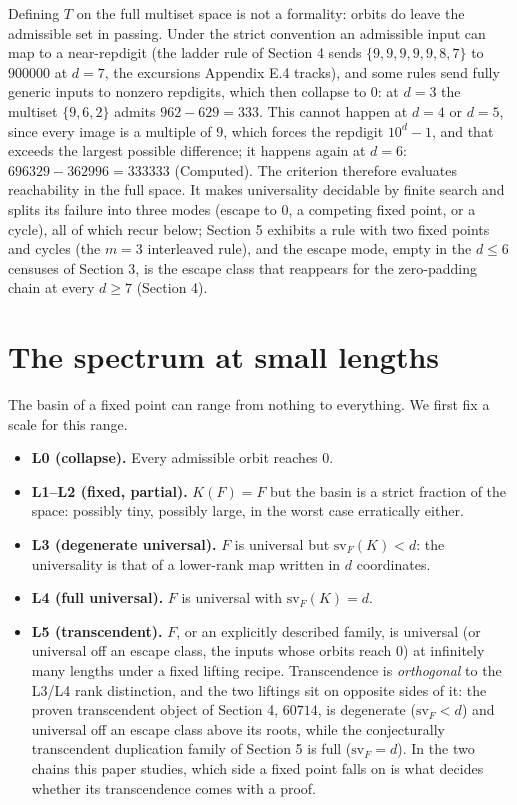 \documentclass[11pt,letterpaper]{article}
\providecommand{\tightlist}{%
  \setlength{\itemsep}{0pt}\setlength{\parskip}{0pt}}
\theoremstyle{paperstyle}
\theoremstyle{paperstyledef}
\theoremstyle{paperstylerem}
\begin{document}
Defining \(T\) on the full multiset space is not a formality: orbits do leave the admissible set in passing. Under the strict convention an admissible input can map to a near-repdigit (the ladder rule of Section 4 sends \(\{9,9,9,9,9,8,7\}\) to \(900000\) at \(d = 7\), the excursions Appendix E.4 tracks), and some rules send fully generic inputs to nonzero repdigits, which then collapse to \(0\): at \(d = 3\) the multiset \(\{9,6,2\}\) admits \(962 - 629 = 333\). This cannot happen at \(d = 4\) or \(d = 5\), since every image is a multiple of \(9\), which forces the repdigit \(10^d - 1\), and that exceeds the largest possible difference; it happens again at \(d = 6\): \(696329 - 362996 = 333333\) (Computed). The criterion therefore evaluates reachability in the full space. It makes universality decidable by finite search and splits its failure into three modes (escape to \(0\), a competing fixed point, or a cycle), all of which recur below; Section 5 exhibits a rule with two fixed points and cycles (the \(m = 3\) interleaved rule), and the escape mode, empty in the \(d \leq 6\) censuses of Section 3, is the escape class that reappears for the zero-padding chain at every \(d \geq 7\) (Section 4).

\section{The spectrum at small lengths}\label{the-spectrum-at-small-lengths}

The basin of a fixed point can range from nothing to everything. We first fix a scale for this range.

\begin{itemize}
\tightlist
\item
  \textbf{L0 (collapse).} Every admissible orbit reaches \(0\).
\item
  \textbf{L1--L2 (fixed, partial).} \(K(F) = F\) but the basin is a strict fraction of the space: possibly tiny, possibly large, in the worst case erratically either.
\item
  \textbf{L3 (degenerate universal).} \(F\) is universal but \(\mathrm{sv}_F(K) < d\): the universality is that of a lower-rank map written in \(d\) coordinates.
\item
  \textbf{L4 (full universal).} \(F\) is universal with \(\mathrm{sv}_F(K) = d\).
\item
  \textbf{L5 (transcendent).} \(F\), or an explicitly described family, is universal (or universal off an escape class, the inputs whose orbits reach \(0\)) at infinitely many lengths under a fixed lifting recipe. Transcendence is \emph{orthogonal} to the L3/L4 rank distinction, and the two liftings sit on opposite sides of it: the proven transcendent object of Section 4, \(60714\), is degenerate (\(\mathrm{sv}_F < d\)) and universal off an escape class above its roots, while the conjecturally transcendent duplication family of Section 5 is full (\(\mathrm{sv}_F = d\)). In the two chains this paper studies, which side a fixed point falls on is what decides whether its transcendence comes with a proof.
\end{itemize}
\end{document}
